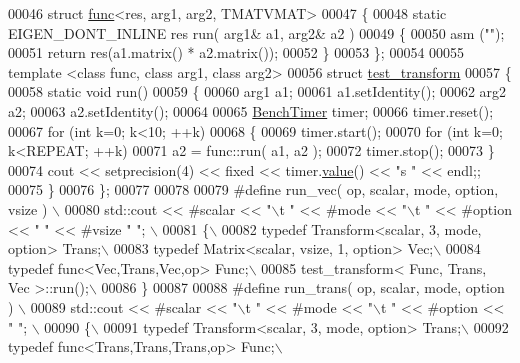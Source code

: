 \begin{DoxyCode}
00046 \textcolor{keyword}{struct }\hyperlink{structfunc}{func}<res, arg1, arg2, TMATVMAT>
00047 \{
00048     \textcolor{keyword}{static} EIGEN\_DONT\_INLINE res run( arg1& a1, arg2& a2 )
00049     \{
00050     \textcolor{keyword}{asm} (\textcolor{stringliteral}{""});
00051     \textcolor{keywordflow}{return} res(a1.matrix() * a2.matrix());
00052     \}
00053 \};
00054 
00055 \textcolor{keyword}{template} <\textcolor{keyword}{class} func, \textcolor{keyword}{class} arg1, \textcolor{keyword}{class} arg2>
00056 \textcolor{keyword}{struct }\hyperlink{structtest__transform}{test\_transform}
00057 \{
00058     \textcolor{keyword}{static} \textcolor{keywordtype}{void} run()
00059     \{
00060     arg1 a1;
00061     a1.setIdentity();
00062     arg2 a2;
00063     a2.setIdentity();
00064 
00065     \hyperlink{class_eigen_1_1_bench_timer}{BenchTimer} timer;
00066     timer.reset();
00067     \textcolor{keywordflow}{for} (\textcolor{keywordtype}{int} k=0; k<10; ++k)
00068     \{
00069         timer.start();
00070         \textcolor{keywordflow}{for} (\textcolor{keywordtype}{int} k=0; k<REPEAT; ++k)
00071         a2 = func::run( a1, a2 );
00072         timer.stop();
00073     \}
00074     cout << setprecision(4) << fixed << timer.\hyperlink{class_eigen_1_1_bench_timer_a26760f963ed8b64c126159bfea57735e}{value}() << \textcolor{stringliteral}{"s  "} << endl;;
00075     \}
00076 \};
00077 
00078 
00079 \textcolor{preprocessor}{#define run\_vec( op, scalar, mode, option, vsize ) \(\backslash\)}
00080 \textcolor{preprocessor}{    std::cout << #scalar << "\(\backslash\)t " << #mode << "\(\backslash\)t " << #option << " " << #vsize " "; \(\backslash\)}
00081 \textcolor{preprocessor}{    \{\(\backslash\)}
00082 \textcolor{preprocessor}{    typedef Transform<scalar, 3, mode, option> Trans;\(\backslash\)}
00083 \textcolor{preprocessor}{    typedef Matrix<scalar, vsize, 1, option> Vec;\(\backslash\)}
00084 \textcolor{preprocessor}{    typedef func<Vec,Trans,Vec,op> Func;\(\backslash\)}
00085 \textcolor{preprocessor}{    test\_transform< Func, Trans, Vec >::run();\(\backslash\)}
00086 \textcolor{preprocessor}{    \}}
00087 
00088 \textcolor{preprocessor}{#define run\_trans( op, scalar, mode, option ) \(\backslash\)}
00089 \textcolor{preprocessor}{    std::cout << #scalar << "\(\backslash\)t " << #mode << "\(\backslash\)t " << #option << "   "; \(\backslash\)}
00090 \textcolor{preprocessor}{    \{\(\backslash\)}
00091 \textcolor{preprocessor}{    typedef Transform<scalar, 3, mode, option> Trans;\(\backslash\)}
00092 \textcolor{preprocessor}{    typedef func<Trans,Trans,Trans,op> Func;\(\backslash\)}

\end{DoxyCode}
